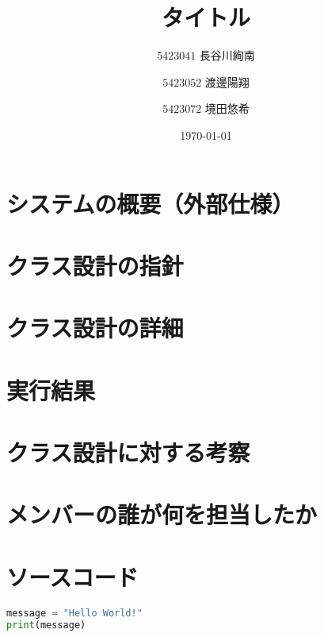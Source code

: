 \documentclass[dvipdfmx]{jsarticle} %
\title{タイトル}
\author{$5423041$ 長谷川絢南 \and $5423052$ 渡邊陽翔 \and $5423072$ 境田悠希}
\date{\today}
\theoremstyle{definition} %
\begin{document}

\maketitle %

\begin{abstract} %
  
\end{abstract}

\section{システムの概要（外部仕様）}

\section{クラス設計の指針}

\section{クラス設計の詳細}

\section{実行結果}

\section{クラス設計に対する考察}

\section{}

\appendix %

\section{メンバーの誰が何を担当したか}

\section{ソースコード}

\lstset{
  frame=single, %
  numbers=left, %
  breaklines = true %
}

\begin{lstlisting}[language=Python,caption=hello\_world.py,label=code:hello_world]
message = "Hello World!"
print(message)
\end{lstlisting}
\end{document}
